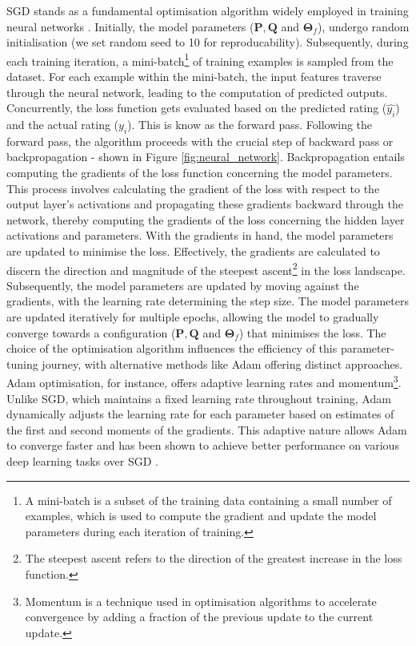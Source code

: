 SGD stands as a fundamental optimisation algorithm widely employed in training neural networks \cite{abdi1999neural}. Initially, the model parameters ($\mathbf{P}, \mathbf{Q}$ and $\boldsymbol{\Theta}_f$), undergo random initialisation (we set random seed to 10 for reproducability). Subsequently, during each training iteration, a mini-batch\footnote{A mini-batch is a subset of the training data containing a small number of examples, which is used to compute the gradient and update the model parameters during each iteration of training.} of training examples is sampled from the dataset. For each example within the mini-batch, the input features traverse through the neural network, leading to the computation of predicted outputs. Concurrently, the loss function gets evaluated based on the predicted rating ($\hat{y_i}$) and the actual rating ($y_i$). This is know as the forward pass. Following the forward pass, the algorithm proceeds with the crucial step of backward pass or backpropagation - shown in Figure \ref{fig:neural_network}. Backpropagation entails computing the gradients of the loss function concerning the model parameters. This process involves calculating the gradient of the loss with respect to the output layer's activations and propagating these gradients backward through the network, thereby computing the gradients of the loss concerning the hidden layer activations and parameters. With the gradients in hand, the model parameters are updated to minimise the loss. Effectively, the gradients are calculated to discern the direction and magnitude of the steepest ascent\footnote{The steepest ascent refers to the direction of the greatest increase in the loss function.} in the loss landscape. Subsequently, the model parameters are updated by moving against the gradients, with the learning rate determining the step size. The model parameters are updated iteratively for multiple epochs, allowing the model to gradually converge towards a configuration ($\mathbf{P}, \mathbf{Q}$ and $\boldsymbol{\Theta}_f$) that minimises the loss. The choice of the optimisation algorithm influences the efficiency of this parameter-tuning journey, with alternative methods like Adam offering distinct approaches. Adam optimisation, for instance, offers adaptive learning rates and momentum\footnote{Momentum is a technique used in optimisation algorithms to accelerate convergence by adding a fraction of the previous update to the current update.}. Unlike SGD, which maintains a fixed learning rate throughout training, Adam dynamically adjusts the learning rate for each parameter based on estimates of the first and second moments of the gradients. This adaptive nature allows Adam to converge faster and has been shown to achieve better performance on various deep learning tasks over SGD \cite{zhang2018improved}.


